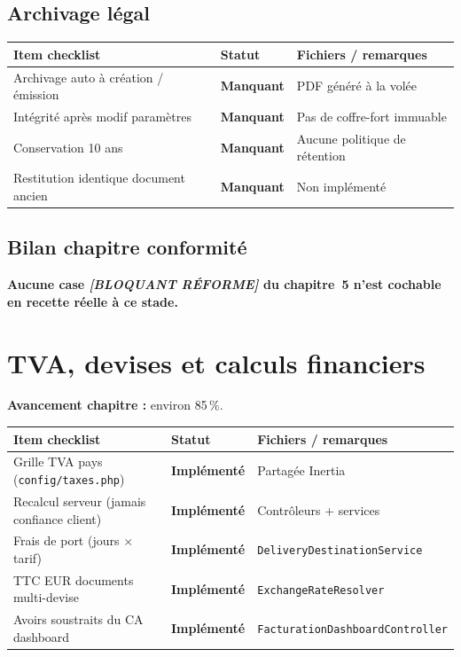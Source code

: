 \documentclass[11pt,a4paper]{report}
\newcommand{\route}[1]{\texttt{\small #1}}
\newcommand{\ctrl}[1]{\texttt{\small #1}}
\newcommand{\svc}[1]{\texttt{\small #1}}
\newcommand{\statimpl}{\textcolor{statok}{\textbf{Implémenté}}}
\newcommand{\statmiss}{\textcolor{statno}{\textbf{Manquant}}}
\begin{document}
\section{Archivage légal}

\begin{longtable}{@{}L{7.8cm}C{2.4cm}L{4.4cm}@{}}
    \toprule
    \textbf{Item checklist} & \textbf{Statut} & \textbf{Fichiers / remarques} \\
    \midrule
    \endhead
    Archivage auto à création / émission & \statmiss & PDF généré à la volée \\
    Intégrité après modif paramètres & \statmiss & Pas de coffre-fort immuable \\
    Conservation 10 ans & \statmiss & Aucune politique de rétention \\
    Restitution identique document ancien & \statmiss & Non implémenté \\
    \bottomrule
\end{longtable}

\section{Bilan chapitre conformité}

\noindent\textbf{Aucune case \emph{[BLOQUANT RÉFORME]} du chapitre~5 n'est cochable en recette réelle à ce stade.}

\chapter{TVA, devises et calculs financiers}

\textbf{Avancement chapitre :} environ 85\,\%.

\begin{longtable}{@{}L{7.8cm}C{2.4cm}L{4.4cm}@{}}
    \toprule
    \textbf{Item checklist} & \textbf{Statut} & \textbf{Fichiers / remarques} \\
    \midrule
    \endhead
    Grille TVA pays (\route{config/taxes.php}) & \statimpl & Partagée Inertia \\
    Recalcul serveur (jamais confiance client) & \statimpl & Contrôleurs + services \\
    Frais de port (jours $\times$ tarif) & \statimpl & \svc{DeliveryDestinationService} \\
    TTC EUR documents multi-devise & \statimpl & \svc{ExchangeRateResolver} \\
    Avoirs soustraits du CA dashboard & \statimpl & \ctrl{FacturationDashboardController} \\
    \bottomrule
\end{longtable}
\end{document}
